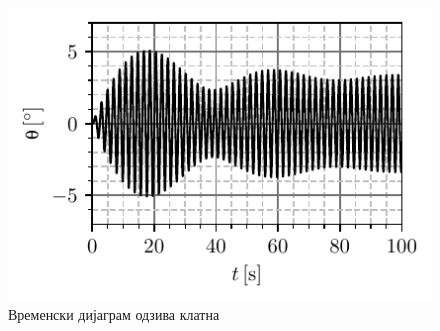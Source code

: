 \begin{figure}[ht!]
    \centering
    \includegraphics{fig/klatno_plot.pdf}
    \caption{Временски дијаграм одзива клатна}
    \label{\ID.res}
\end{figure}